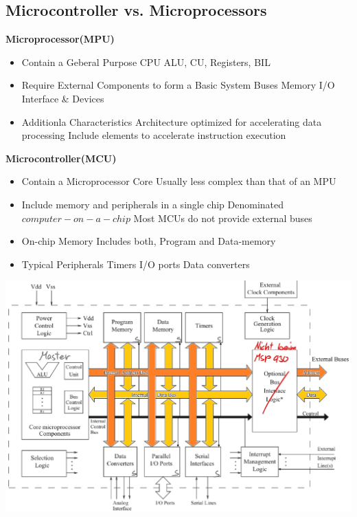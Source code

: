 \subsection{Microcontroller vs. Microprocessors}
\begin{multicols}{2}
    \begin{minipage}{\linewidth}
        \textbf{Microprocessor(MPU)}
       \begin{itemize}
           \item Contain a Geberal Purpose CPU
               \subitem ALU, CU, Registers, BIL %
           \item Require External Components to form a Basic System
               \subitem Buses
               \subitem Memory
               \subitem I/O Interface \& Devices
           \item Additionla Characteristics
               \subitem Architecture optimized for accelerating data processing
               \subitem Include elements to accelerate instruction execution  
        \end{itemize}
    \end{minipage}
    \begin{minipage}{\linewidth}
        \textbf{Microcontroller(MCU)}
        \begin{itemize}
            \item Contain a Microprocessor Core
                \subitem Usually less complex than that of an MPU
            \item Include memory and peripherals in a single chip
                \subitem Denominated $ computer-on-a-chip $ 
                \subitem Most MCUs do not provide external buses
            \item On-chip Memory
                \subitem Includes both, Program and Data-memory
            \item Typical Peripherals
                \subitem Timers
                \subitem I/O ports
                \subitem Data converters
        \end{itemize}     
    \end{minipage}
\end{multicols}
\begin{center}
\includegraphics[width=0.6\linewidth]{images/mCStructure}
\end{center}
